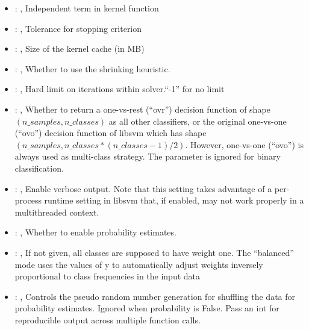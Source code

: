 \begin{itemize}
    \item {}: , 
      Independent term in kernel function

    \item {}: , 
      Tolerance for stopping criterion

    \item {}: , 
      Size of the kernel cache (in MB)

    \item {}: , 
      Whether to use the shrinking heuristic.

    \item {}: , 
      Hard limit on iterations within solver.``-1'' for no limit

    \item {}: , 
      Whether to return a one-vs-rest (``ovr'') decision function of shape $(n\_samples, n\_classes)$
      as                                                            all other classifiers, or the
      original one-vs-one (``ovo'') decision function of libsvm which has
      shape $(n\_samples, n\_classes * (n\_classes - 1) / 2)$. However, one-vs-one (``ovo'') is always
      used as                                                            multi-class strategy. The
      parameter is ignored for binary classification.

    \item {}: , 
      Enable verbose output. Note that this setting takes advantage
      of a per-process runtime setting in libsvm that, if enabled, may not
      work properly in a multithreaded context.

    \item {}: , 
      Whether to enable probability estimates.

    \item {}: \xmlDesc{[balanced]}, 
      If not given, all classes are supposed to have weight one.
      The “balanced” mode uses the values of y to automatically adjust weights
      inversely proportional to class frequencies in the input data

    \item {}: , 
      Controls the pseudo random number generation for shuffling
      the data for probability estimates. Ignored when probability is False.
      Pass an int for reproducible output across multiple function calls.
  \end{itemize}


